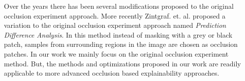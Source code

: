 Over the years there has been several modifications proposed to the original occlusion experiment approach. More recently Zintgraf. et. al. \cite{zintgraf2017visualizing} proposed a variation to the original occlusion experiment approach named \textit{Prediction Difference Analysis}. In this method instead of masking with a grey or black patch, samples from surrounding regions in the image are chosen as occlusion patches.
In our work we mainly focus on the original occlusion experiment method. But, the methods and optimizations proposed in our work are readily applicable to more advanced occlusion based explainability approaches.